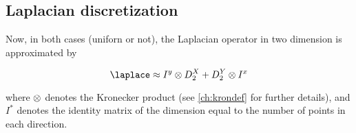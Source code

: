 \subsection{Laplacian discretization}

Now, in both cases (uniforn or not), the Laplacian operator in two dimension is approximated by 

\begin{equation}
    \lap \approx I^y \kron D_2^X + D_2^Y \kron I^x
    \label{eq:lapprox}
\end{equation}

where $\otimes$ denotes the Kronecker product (see \ref{ch:krondef} for further details), and $I^*$ denotes the identity matrix of the dimension equal to the number of points in each direction.
